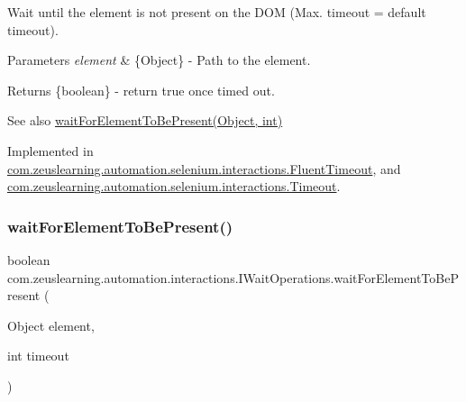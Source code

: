 Wait until the element is not present on the D\+OM (Max. timeout = default timeout).


\begin{DoxyParams}{Parameters}
{\em element} & \{Object\} -\/ Path to the element.\\
\hline
\end{DoxyParams}
\begin{DoxyReturn}{Returns}
\{boolean\} -\/ return {\ttfamily true} once timed out.
\end{DoxyReturn}
\begin{DoxySeeAlso}{See also}
\hyperlink{interfacecom_1_1zeuslearning_1_1automation_1_1interactions_1_1IWaitOperations_a768e53257a1c960d74e048b1aa5fe145}{wait\+For\+Element\+To\+Be\+Present(\+Object, int)} 
\end{DoxySeeAlso}


Implemented in \hyperlink{classcom_1_1zeuslearning_1_1automation_1_1selenium_1_1interactions_1_1FluentTimeout_a83338a2e6ff1028ec988d6122e4afeab}{com.\+zeuslearning.\+automation.\+selenium.\+interactions.\+Fluent\+Timeout}, and \hyperlink{classcom_1_1zeuslearning_1_1automation_1_1selenium_1_1interactions_1_1Timeout_a5b1fb9f2a2d0d61ec2b882269a3826d5}{com.\+zeuslearning.\+automation.\+selenium.\+interactions.\+Timeout}.

\hypertarget{interfacecom_1_1zeuslearning_1_1automation_1_1interactions_1_1IWaitOperations_a768e53257a1c960d74e048b1aa5fe145}{}\label{interfacecom_1_1zeuslearning_1_1automation_1_1interactions_1_1IWaitOperations_a768e53257a1c960d74e048b1aa5fe145} 
\subsubsection{\texorpdfstring{wait\+For\+Element\+To\+Be\+Present()}{waitForElementToBePresent()}\hspace{0.1cm}{\footnotesize\ttfamily [2/2]}}
{\footnotesize\ttfamily boolean com.\+zeuslearning.\+automation.\+interactions.\+I\+Wait\+Operations.\+wait\+For\+Element\+To\+Be\+Present (\begin{DoxyParamCaption}\item[{Object}]{element,  }\item[{int}]{timeout }\end{DoxyParamCaption})}

